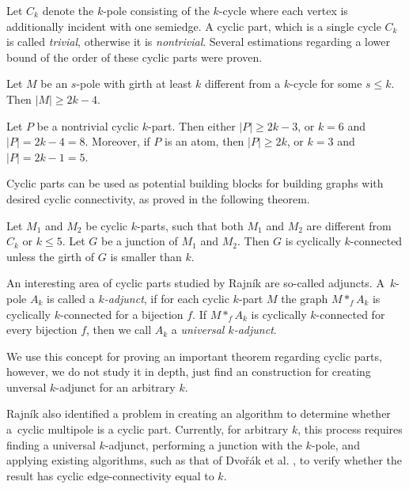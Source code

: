 \documentclass[12pt, twoside]{book}
\begin{document}
Let $C_k$ denote the $k$-pole consisting of the $k$-cycle where each vertex is additionally incident with one semiedge. A cyclic part, which is a single cycle $C_k$ is called \textit{trivial}, otherwise it is \textit{nontrivial}. Several estimations regarding a lower bound of the order of these cyclic parts were proven.

\begin{lemma}\label{lem:rajnik5.1}
	Let $M$ be an $s$-pole with girth at least $k$ different from a $k$-cycle for some $s\leq k$. Then $|M| \geq 2k - 4$.
\end{lemma}

\begin{theorem}
	Let $P$ be a nontrivial cyclic $k$-part. Then either $|P|\geq 2k-3$, or $k = 6$ and $|P|= 2k-4 = 8$. Moreover, if $P$ is an atom, then $|P| \geq 2k$, or $k = 3$ and $|P| = 2k-1 = 5$.
\end{theorem}

Cyclic parts can be used as potential building blocks for building graphs with desired cyclic connectivity, as proved in the following theorem.

\begin{theorem}
	Let $M_1$ and $M_2$ be cyclic $k$-parts, such that both $M_1$ and $M_2$ are diﬀerent from $C_k$ or $k\leq 5$. Let $G$ be a junction of $M_1$ and $M_2$. Then $G$ is cyclically $k$-connected unless the girth of $G$ is smaller than $k$.
\end{theorem}

An interesting area of cyclic parts studied by Rajník \cite{Rajnik_phd} are so-called adjuncts. A~$k$-pole $A_k$ is called a \textit{$k$-adjunct}, if for each cyclic $k$-part $M$ the graph $M*_f A_k$ is cyclically $k$-connected for a bijection $f$. If $M*_f A_k$ is cyclically $k$-connected for every bijection $f$, then we call $A_k$ a \emph{universal $k$-adjunct}.

We use this concept for proving an important theorem regarding cyclic parts, however, we do not study it in depth, just find an construction for creating unversal $k$-adjunct for an arbitrary $k$.

Rajník \cite{Rajnik_phd} also identified a problem in creating an algorithm to determine whether a~cyclic multipole is a cyclic part. Currently, for arbitrary $k$, this process requires finding a universal $k$-adjunct, performing a junction with the $k$-pole, and applying existing algorithms, such as that of Dvořák et al. \cite{Dvorak2004}, to verify whether the result has cyclic edge-connectivity equal to $k$.
\end{document}
